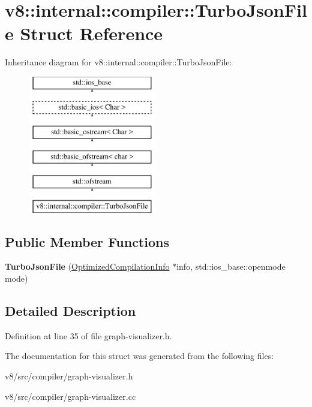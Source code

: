 \hypertarget{structv8_1_1internal_1_1compiler_1_1TurboJsonFile}{}\section{v8\+:\+:internal\+:\+:compiler\+:\+:Turbo\+Json\+File Struct Reference}
\label{structv8_1_1internal_1_1compiler_1_1TurboJsonFile}
Inheritance diagram for v8\+:\+:internal\+:\+:compiler\+:\+:Turbo\+Json\+File\+:\begin{figure}[H]
\begin{center}
\leavevmode
\includegraphics[height=6.000000cm]{structv8_1_1internal_1_1compiler_1_1TurboJsonFile}
\end{center}
\end{figure}
\subsection*{Public Member Functions}
\begin{DoxyCompactItemize}
\item 
\mbox{\label{structv8_1_1internal_1_1compiler_1_1TurboJsonFile_ab91ea9969a59e64b020a6fa1c617d911}} 
{\bfseries Turbo\+Json\+File} (\mbox{\hyperlink{classv8_1_1internal_1_1OptimizedCompilationInfo}{Optimized\+Compilation\+Info}} $\ast$info, std\+::ios\+\_\+base\+::openmode mode)
\end{DoxyCompactItemize}


\subsection{Detailed Description}


Definition at line 35 of file graph-\/visualizer.\+h.



The documentation for this struct was generated from the following files\+:\begin{DoxyCompactItemize}
\item 
v8/src/compiler/graph-\/visualizer.\+h\item 
v8/src/compiler/graph-\/visualizer.\+cc\end{DoxyCompactItemize}
